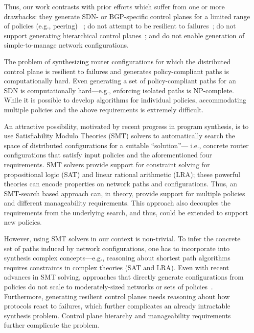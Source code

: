 \documentclass[sigconf]{acmart}
\begin{document}
Thus, our work contrasts with prior efforts which suffer
from one or more drawbacks: they generate SDN- or BGP-specific
control planes for a limited range of policies (e.g., peering)
~\cite{netkat,merlin,netegg,fattire,simple,sol,propane}; do not
attempt to be resilient to failures~\cite{synet}; 
do not support generating
hierarchical control planes~\cite{propane}; 
and do not enable generation of
simple-to-manage network configurations. 

The problem of synthesizing router configurations for which the
distributed control plane is resilient to failures and generates
policy-compliant paths is computationally hard. Even generating a set
of policy-compliant paths for an SDN is computationally hard---e.g.,
enforcing isolated paths is NP-complete. While it is possible to
develop algorithms for individual policies, accommodating multiple
policies and the above requirements is extremely difficult.


An attractive possibility, motivated by recent progress in program
synthesis, is to use
Satisfiability Modulo Theories (SMT) solvers to automatically search
the space of distributed configurations for a suitable ``solution''---
i.e., concrete router configurations that satisfy input policies and
the aforementioned four requirements. SMT solvers provide support for
constraint solving for propositional logic (SAT) and linear rational
arithmetic (LRA); these powerful theories can  
encode properties on network paths 
and configurations. Thus, an SMT-search based approach can, in theory,
provide support for multiple policies and different manageability requirements. 
This approach also decouples the requirements from the underlying search, 
and thus, could be extended to support new policies. 

However, using SMT solvers in our context is
non-trivial.  To infer the concrete set of paths induced by network
configurations, one has to incorporate into synthesis complex
concepts---e.g., reasoning about shortest path algorithms requires
constraints in complex theories (SAT and LRA).  Even with recent
advances in SMT solving, approaches that directly generate
configurations from policies do not scale to moderately-sized networks
or sets of policies~\cite{synet}. Furthermore, generating resilient
control planes needs reasoning about how protocols react to failures,
which further complicates an already intractable synthesis
problem. Control plane hierarchy and manageability requirements further
complicate the problem.
\end{document}
